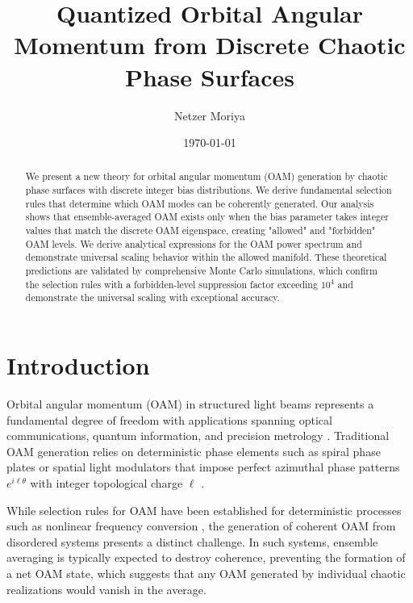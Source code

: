 \documentclass[a4paper,12pt]{article}
\begin{document}
\title{Quantized Orbital Angular Momentum from Discrete Chaotic Phase Surfaces}

\author{Netzer Moriya}

\date{\today}

\maketitle

\begin{abstract}
We present a new theory for orbital angular momentum (OAM) generation by chaotic phase surfaces with 
discrete integer bias distributions. We derive fundamental selection rules that determine which OAM modes 
can be coherently generated. 
Our analysis shows that ensemble-averaged OAM exists only when the bias parameter takes integer values 
that match the discrete OAM eigenspace, creating "allowed" and "forbidden" OAM levels. We derive 
analytical expressions for the OAM power spectrum and demonstrate universal scaling behavior within 
the allowed manifold. 
These theoretical predictions are validated by comprehensive Monte Carlo simulations, 
which confirm the selection rules with a forbidden-level suppression factor exceeding 
$10^4$ and demonstrate the universal scaling with exceptional accuracy.
\end{abstract}

\section{Introduction}

Orbital angular momentum (OAM) in structured light beams represents a fundamental degree of freedom with 
applications spanning optical communications, quantum information, and precision 
metrology \cite{allen1992orbital, yao2011orbital}. Traditional OAM generation relies on deterministic 
phase elements such as spiral phase plates or spatial light modulators that impose perfect azimuthal phase 
patterns $e^{i\ell\theta}$ with integer topological charge $\ell$ \cite{molina2007twisted, forbes2016creation, Berry2022}.

While selection rules for OAM have been established for deterministic processes such as nonlinear frequency 
conversion \cite{Curcio2021}, the generation of coherent OAM from disordered systems presents a distinct challenge. 
In such systems, ensemble averaging is typically expected to destroy coherence, preventing the formation of 
a net OAM state, which suggests that any OAM generated by 
individual chaotic realizations would vanish in the average.
\end{document}
